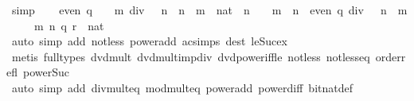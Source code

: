 \begin{isabellebody}
\ simp\isanewline
\ \ \isamarkupfalse%
\ {\isacartoucheopen}even\ {\isacharparenleft}{\kern0pt}q\ {\isacharasterisk}{\kern0pt}\ {}\ {\isacharcircum}{\kern0pt}\ m\ div\ {}\ {\isacharcircum}{\kern0pt}\ n{\isacharparenright}{\kern0pt}\ {\isasymlongleftrightarrow}\ n\ {\isacharless}{\kern0pt}\ m\ {\isasymor}\ {\isacharparenleft}{\kern0pt}{}{\isacharcolon}{\kern0pt}{\isacharcolon}{\kern0pt}nat{\isacharparenright}{\kern0pt}\ {\isacharcircum}{\kern0pt}\ n\ {\isacharequal}{\kern0pt}\ {}\ {\isasymor}\ m\ {\isasymle}\ n\ {\isasymand}\ even\ {\isacharparenleft}{\kern0pt}q\ div\ {}\ {\isacharcircum}{\kern0pt}\ {\isacharparenleft}{\kern0pt}n\ {\isacharminus}{\kern0pt}\ m{\isacharparenright}{\kern0pt}{\isacharparenright}{\kern0pt}{\isacartoucheclose}\isanewline
\ \ \ \ \ m\ n\ q\ r\ {\isacharcolon}{\kern0pt}{\isacharcolon}{\kern0pt}\ nat\isanewline
\ \ \ \ \isamarkupfalse%
\ {\isacharparenleft}{\kern0pt}auto\ simp\ add{\isacharcolon}{\kern0pt}\ not{\isacharunderscore}{\kern0pt}less\ power{\isacharunderscore}{\kern0pt}add\ ac{\isacharunderscore}{\kern0pt}simps\ dest{\isacharbang}{\kern0pt}{\isacharcolon}{\kern0pt}\ le{\isacharunderscore}{\kern0pt}Suc{\isacharunderscore}{\kern0pt}ex{\isacharparenright}{\kern0pt}\isanewline
\ \ \ \ \isamarkupfalse%
\ {\isacharparenleft}{\kern0pt}metis\ {\isacharparenleft}{\kern0pt}full{\isacharunderscore}{\kern0pt}types{\isacharparenright}{\kern0pt}\ dvd{\isacharunderscore}{\kern0pt}mult\ dvd{\isacharunderscore}{\kern0pt}mult{\isacharunderscore}{\kern0pt}imp{\isacharunderscore}{\kern0pt}div\ dvd{\isacharunderscore}{\kern0pt}power{\isacharunderscore}{\kern0pt}iff{\isacharunderscore}{\kern0pt}le\ not{\isacharunderscore}{\kern0pt}less\ not{\isacharunderscore}{\kern0pt}less{\isacharunderscore}{\kern0pt}eq\ order{\isacharunderscore}{\kern0pt}refl\ power{\isacharunderscore}{\kern0pt}Suc{\isacharparenright}{\kern0pt}\isanewline
\ \ \ \ \isamarkupfalse%
\isanewline
{}\isamarkupfalse%
\ {\isacharparenleft}{\kern0pt}auto\ simp\ add{\isacharcolon}{\kern0pt}\ div{\isacharunderscore}{\kern0pt}mult{}{\isacharunderscore}{\kern0pt}eq\ mod{\isacharunderscore}{\kern0pt}mult{}{\isacharunderscore}{\kern0pt}eq\ power{\isacharunderscore}{\kern0pt}add\ power{\isacharunderscore}{\kern0pt}diff\ bit{\isacharunderscore}{\kern0pt}nat{\isacharunderscore}{\kern0pt}def{\isacharparenright}{\kern0pt}%
\endisatagproof
{\isafoldproof}%
%
\isadelimproof
\isanewline
%
\endisadelimproof
\isanewline

\end{isabellebody}
